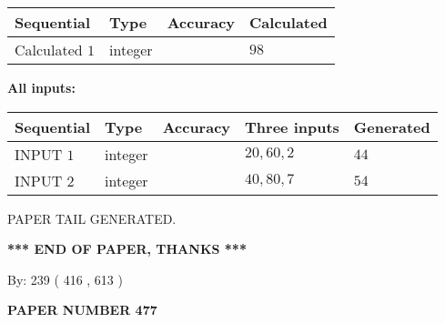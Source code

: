 \documentclass[12pt]{article}
\begin{document}
   
   
   
\noindent{}
   
   
  
  
\noindent\begin{tabular}{|l|l|l|l|}
\hline
 Sequential & Type & Accuracy & Calculated \\ 
\hline
 
 
  Calculated $  1 $ & integer &  & 
  $ 98 $ 
 \\  \hline  
 \end{tabular}
   
   
   
   
\noindent\vspace{0.1in}\hspace{-0.08in} {\textbf{\Large{All inputs: }}}
   
   
  
  
\noindent\begin{tabular}{|l|l|l|l|l|}
\hline
 Sequential & Type & Accuracy & Three inputs & Generated \\ 
\hline
 
 
  INPUT $  1 $ & integer &  & $
 20
 , 
 60
 , 
 2
 $ & $ 44 $ 
 \\  \hline  
 
 
  INPUT $  2 $ & integer &  & $
 40
 , 
 80
 , 
 7
 $ & $ 54 $ 
 \\  \hline  
 \end{tabular}
   
   
   
   
   
   
 \vspace{0.2in}
 
   
   
\vspace{2.0in} PAPER TAIL GENERATED.
   
   
   
   
\vspace{1.0in} 
{\textbf{\large{ *** END OF PAPER, THANKS *** }}} 
   
   
\hspace{1.0in} By: 
 239 ( 416 ,  613 )
   
   
   
   
\newpage 
\setcounter{page}{ 
   477001 } 
   
   
   
   
 {\textbf{ \Large{ PAPER NUMBER  477  }}}
   
\end{document}
